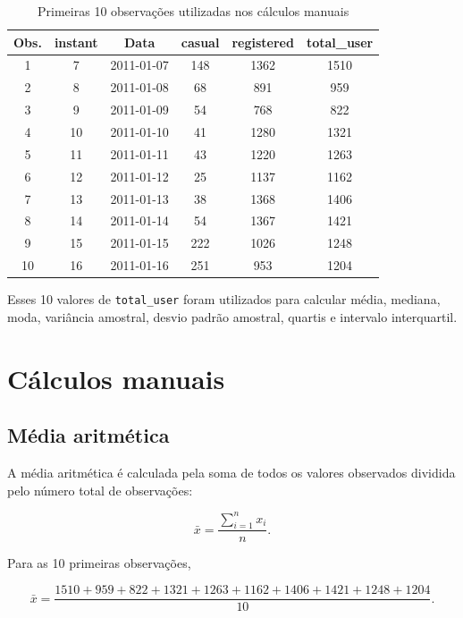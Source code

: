 \documentclass[12pt,a4paper]{article}
\begin{document}
\begin{table}[H]
\centering
\caption{Primeiras 10 observações utilizadas nos cálculos manuais}
\begin{tabular}{cccccc}
\toprule
\textbf{Obs.} &
\textbf{instant} &
\textbf{Data} &
\textbf{casual} &
\textbf{registered} &
\textbf{total\_user} \\
\midrule
1  & 7  & 2011-01-07 & 148 & 1362 & 1510 \\
2  & 8  & 2011-01-08 & 68  & 891  & 959  \\
3  & 9  & 2011-01-09 & 54  & 768  & 822  \\
4  & 10 & 2011-01-10 & 41  & 1280 & 1321 \\
5  & 11 & 2011-01-11 & 43  & 1220 & 1263 \\
6  & 12 & 2011-01-12 & 25  & 1137 & 1162 \\
7  & 13 & 2011-01-13 & 38  & 1368 & 1406 \\
8  & 14 & 2011-01-14 & 54  & 1367 & 1421 \\
9  & 15 & 2011-01-15 & 222 & 1026 & 1248 \\
10 & 16 & 2011-01-16 & 251 & 953  & 1204 \\
\bottomrule
\end{tabular}
\end{table}

Esses 10 valores de \texttt{total\_user} foram utilizados para calcular média,
mediana, moda, variância amostral, desvio padrão amostral, quartis e intervalo
interquartil.

\section{Cálculos manuais}

\subsection{Média aritmética}

A média aritmética é calculada pela soma de todos os valores observados dividida
pelo número total de observações:

\begin{equation}
\bar{x} =
\frac{\sum_{i=1}^{n} x_i}{n}.
\end{equation}

Para as 10 primeiras observações,

\begin{equation}
\bar{x} =
\frac{
1510 + 959 + 822 + 1321 + 1263 +
1162 + 1406 + 1421 + 1248 + 1204
}{10}.
\end{equation}
\end{document}
